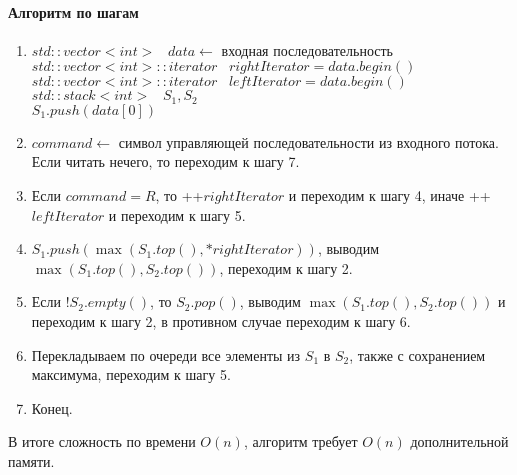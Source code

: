 \documentclass[12pt]{article}
\begin{document}
\paragraph{Алгоритм по шагам}
\begin{enumerate}
    \item $ std::vector<int> \;\;\; data \leftarrow $ входная последовательность \\
          $ std::vector<int>::iterator \;\;\; rightIterator = data.begin() $ \\
          $ std::vector<int>::iterator \;\;\; leftIterator = data.begin() $ \\
          $ std::stack<int> \;\;\; S_1, S_2 $ \\
          $ S_1.push(data[0]) $
    \item $ command \leftarrow $ символ управляющей последовательности из входного потока.
          Если читать нечего, то переходим к шагу 7.
    \item Если $ command = R $, то   ++$rightIterator $ и переходим к шагу 4, иначе ++$leftIterator$ и переходим к шагу 5.
    \item $ S_1.push(\max(S_1.top(), *rightIterator)) $, выводим $ \max(S_1.top(), S_2.top()) $, переходим к шагу 2.
    \item Если $ ! S_2.empty() $, то $ S_2.pop() $, выводим $ \max(S_1.top(), S_2.top()) $ и переходим к шагу 2,
          в противном случае переходим к шагу 6.
    \item Перекладываем по очереди все элементы из $ S_1 $ в $ S_2 $, также с сохранением максимума, переходим к шагу 5.
    \item Конец.
\end{enumerate}

В итоге сложность по времени $ O(n) $, алгоритм требует $ O(n) $ дополнительной памяти.
\end{document}
